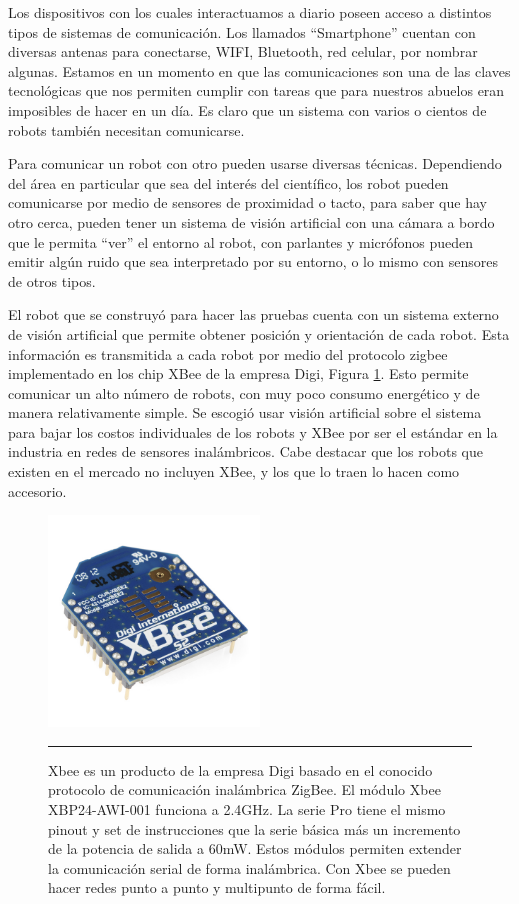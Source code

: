 Los dispositivos con los cuales interactuamos a diario poseen acceso a distintos tipos de sistemas de comunicación. Los llamados “Smartphone” cuentan con diversas antenas para conectarse, WIFI, Bluetooth, red celular,  por nombrar algunas. Estamos en un momento en que las comunicaciones son una de las claves tecnológicas que nos permiten cumplir con tareas que para nuestros abuelos eran imposibles de hacer en un día. Es claro que un sistema con varios o cientos de robots también necesitan comunicarse. 

Para comunicar un robot con otro pueden usarse diversas técnicas. Dependiendo del área en particular que sea del interés del científico, los robot pueden comunicarse por medio de sensores de proximidad o tacto, para saber que hay otro cerca, pueden tener un sistema de visión artificial con una cámara a bordo que le permita “ver” el entorno al robot, con parlantes y micrófonos pueden emitir algún ruido que sea interpretado por su entorno, o lo mismo con sensores de otros tipos.

El robot que se construyó para hacer las pruebas cuenta con un sistema externo de visión artificial que permite obtener posición y orientación de cada robot. Esta información es transmitida a cada robot por medio del protocolo zigbee implementado en los chip XBee de la empresa Digi, Figura \ref{fig:xbee}. Esto permite comunicar un alto número de robots, con muy poco consumo energético y de manera relativamente simple. Se escogió usar visión artificial sobre el sistema para bajar los costos individuales de los robots y XBee por ser el estándar en la industria en redes de sensores inalámbricos. Cabe destacar que los robots que existen en el mercado no incluyen XBee, y los que lo traen lo hacen como accesorio. 


\begin{figure}[htbp]
	\centering
		\includegraphics[width=0.5\textwidth]{./Figures/MODI/xbee.jpg}
		\rule{35em}{0.5pt}
	\caption[xbee]{Xbee es un producto de la empresa Digi basado en el conocido protocolo de comunicación inalámbrica ZigBee. El módulo Xbee XBP24-AWI-001 funciona a 2.4GHz. La serie Pro tiene el mismo pinout y set de instrucciones que la serie básica más un incremento de la potencia de salida a 60mW. Estos módulos permiten extender la comunicación serial de forma inalámbrica.
Con Xbee se pueden hacer redes punto a punto y multipunto de forma fácil.}
	\label{fig:xbee}
\end{figure}

